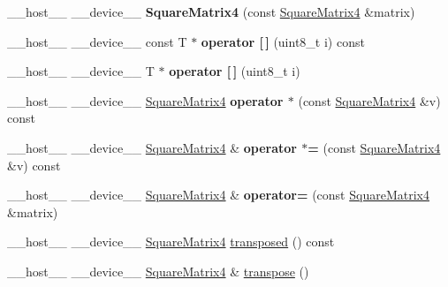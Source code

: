 \begin{DoxyCompactItemize}
\item 
\+\_\+\+\_\+host\+\_\+\+\_\+ \+\_\+\+\_\+device\+\_\+\+\_\+ {\bfseries Square\+Matrix4} (const \hyperlink{class_square_matrix4}{Square\+Matrix4} \&matrix)\hypertarget{class_square_matrix4_a3d2f4a1135af79f7e86e02426abe2319}{}\label{class_square_matrix4_a3d2f4a1135af79f7e86e02426abe2319}

\item 
\+\_\+\+\_\+host\+\_\+\+\_\+ \+\_\+\+\_\+device\+\_\+\+\_\+ const T $\ast$ {\bfseries operator \mbox{[}$\,$\mbox{]}} (uint8\+\_\+t i) const\hypertarget{class_square_matrix4_af20a47c9f0b1eada3e31273d2cb76de9}{}\label{class_square_matrix4_af20a47c9f0b1eada3e31273d2cb76de9}

\item 
\+\_\+\+\_\+host\+\_\+\+\_\+ \+\_\+\+\_\+device\+\_\+\+\_\+ T $\ast$ {\bfseries operator \mbox{[}$\,$\mbox{]}} (uint8\+\_\+t i)\hypertarget{class_square_matrix4_ac748c208ebdb0090978832fae8836f0a}{}\label{class_square_matrix4_ac748c208ebdb0090978832fae8836f0a}

\item 
\+\_\+\+\_\+host\+\_\+\+\_\+ \+\_\+\+\_\+device\+\_\+\+\_\+ \hyperlink{class_square_matrix4}{Square\+Matrix4} {\bfseries operator $\ast$} (const \hyperlink{class_square_matrix4}{Square\+Matrix4} \&v) const\hypertarget{class_square_matrix4_a7cfeb42d0147390448c69b6f4ba74ee0}{}\label{class_square_matrix4_a7cfeb42d0147390448c69b6f4ba74ee0}

\item 
\+\_\+\+\_\+host\+\_\+\+\_\+ \+\_\+\+\_\+device\+\_\+\+\_\+ \hyperlink{class_square_matrix4}{Square\+Matrix4} \& {\bfseries operator $\ast$=} (const \hyperlink{class_square_matrix4}{Square\+Matrix4} \&v) const\hypertarget{class_square_matrix4_af44d511c4d55102c4f72d99692345332}{}\label{class_square_matrix4_af44d511c4d55102c4f72d99692345332}

\item 
\+\_\+\+\_\+host\+\_\+\+\_\+ \+\_\+\+\_\+device\+\_\+\+\_\+ \hyperlink{class_square_matrix4}{Square\+Matrix4} \& {\bfseries operator=} (const \hyperlink{class_square_matrix4}{Square\+Matrix4} \&matrix)\hypertarget{class_square_matrix4_a48e4130c7dc65e2ef42be5e4dbbab914}{}\label{class_square_matrix4_a48e4130c7dc65e2ef42be5e4dbbab914}

\item 
\+\_\+\+\_\+host\+\_\+\+\_\+ \+\_\+\+\_\+device\+\_\+\+\_\+ \hyperlink{class_square_matrix4}{Square\+Matrix4} \hyperlink{class_square_matrix4_a23f36c4b337c5b238b4d3fae04e6f2f0}{transposed} () const
\item 
\+\_\+\+\_\+host\+\_\+\+\_\+ \+\_\+\+\_\+device\+\_\+\+\_\+ \hyperlink{class_square_matrix4}{Square\+Matrix4} \& \hyperlink{class_square_matrix4_a7d6f675b8ae538a7c53fe1e8c390e8b3}{transpose} ()\hypertarget{class_square_matrix4_a7d6f675b8ae538a7c53fe1e8c390e8b3}{}\label{class_square_matrix4_a7d6f675b8ae538a7c53fe1e8c390e8b3}


\end{DoxyCompactItemize}
